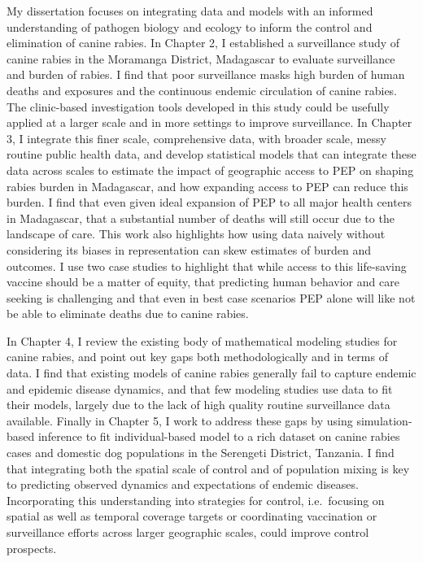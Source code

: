 \documentclass[
  oneside]{book}
\begin{document}
My dissertation focuses on integrating data and models with an informed understanding of pathogen biology and ecology to inform the control and elimination of canine rabies. In Chapter 2, I established a surveillance study of canine rabies in the Moramanga District, Madagascar to evaluate surveillance and burden of rabies. I find that poor surveillance masks high burden of human deaths and exposures and the continuous endemic circulation of canine rabies. The clinic-based investigation tools developed in this study could be usefully applied at a larger scale and in more settings to improve surveillance. In Chapter 3, I integrate this finer scale, comprehensive data, with broader scale, messy routine public health data, and develop statistical models that can integrate these data across scales to estimate the impact of geographic access to PEP on shaping rabies burden in Madagascar, and how expanding access to PEP can reduce this burden. I find that even given ideal expansion of PEP to all major health centers in Madagascar, that a substantial number of deaths will still occur due to the landscape of care. This work also highlights how using data naively without considering its biases in representation can skew estimates of burden and outcomes. I use two case studies to highlight that while access to this life-saving vaccine should be a matter of equity, that predicting human behavior and care seeking is challenging and that even in best case scenarios PEP alone will like not be able to eliminate deaths due to canine rabies.

In Chapter 4, I review the existing body of mathematical modeling studies for canine rabies, and point out key gaps both methodologically and in terms of data. I find that existing models of canine rabies generally fail to capture endemic and epidemic disease dynamics, and that few modeling studies use data to fit their models, largely due to the lack of high quality routine surveillance data available. Finally in Chapter 5, I work to address these gaps by using simulation-based inference to fit individual-based model to a rich dataset on canine rabies cases and domestic dog populations in the Serengeti District, Tanzania. I find that integrating both the spatial scale of control and of population mixing is key to predicting observed dynamics and expectations of endemic diseases. Incorporating this understanding into strategies for control, i.e.~focusing on spatial as well as temporal coverage targets or coordinating vaccination or surveillance efforts across larger geographic scales, could improve control prospects.
\end{document}
